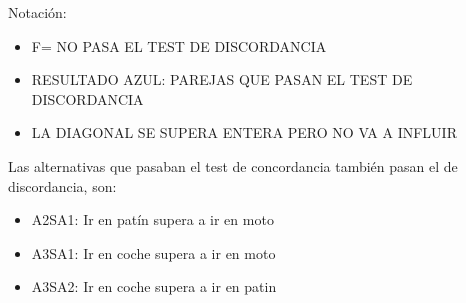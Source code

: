 \documentclass[
]{article}
\newenvironment{Shaded}{\begin{snugshade}}{\end{snugshade}}
\newcommand{\NormalTok}[1]{#1}
\newcommand{\SpecialCharTok}[1]{\textcolor[rgb]{0.00,0.00,0.00}{#1}}
\providecommand{\tightlist}{%
  \setlength{\itemsep}{0pt}\setlength{\parskip}{0pt}}
\begin{document}
Notación:

\begin{itemize}
\tightlist
\item
  F= NO PASA EL TEST DE DISCORDANCIA
\item
  RESULTADO AZUL: PAREJAS QUE PASAN EL TEST DE DISCORDANCIA
\item
  LA DIAGONAL SE SUPERA ENTERA PERO NO VA A INFLUIR
\end{itemize}

Las alternativas que pasaban el test de concordancia también pasan el de
discordancia, son:

\begin{itemize}
\tightlist
\item
  A2SA1: Ir en patín supera a ir en moto
\item
  A3SA1: Ir en coche supera a ir en moto
\item
  A3SA2: Ir en coche supera a ir en patin
\end{itemize}

\begin{Shaded}
\end{Shaded}
\end{document}
